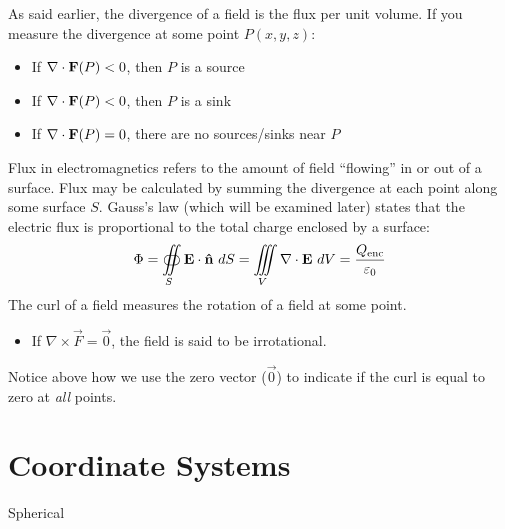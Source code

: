 \begin{note}
    As said earlier, the divergence of a field is the flux per unit volume. If you measure the divergence at some point $P(x,y,z)$:
    \begin{itemize}
        \item If $\nabla\cdot\boldsymbol{\mathrm{F}}(P) < 0$, then $P$ is a source
        \item If $\nabla\cdot\boldsymbol{\mathrm{F}}(P) < 0$, then $P$ is a sink
        \item If $\nabla\cdot\boldsymbol{\mathrm{F}}(P) = 0$, there are no sources/sinks near $P$
    \end{itemize}
    Flux in electromagnetics refers to the amount of field ``flowing'' in or out of a surface. Flux may be calculated by summing the divergence at each point along some surface $S$. Gauss's law (which will be examined later) states that the electric flux is proportional to the total charge enclosed by a surface:
    \begin{equation}
        \Phi = \oiint\limits_S \vec{E} \cdot \uvec{n} \ dS = \iiint\limits_V \nabla \cdot \vec{E} \ dV  = \dfrac{Q_\text{enc}}{\varepsilon_0}
    \end{equation}
    The curl of a field measures the rotation of a field at some point. 
    \begin{itemize}
        \item If $\nabla \times \vec{F} = \vec{0}$, the field is said to be irrotational. 
    \end{itemize}
    Notice above how we use the zero vector ($\vec{0}$) to indicate if the curl is equal to zero at \textit{all} points.
\end{note}

\section{Coordinate Systems}
Spherical